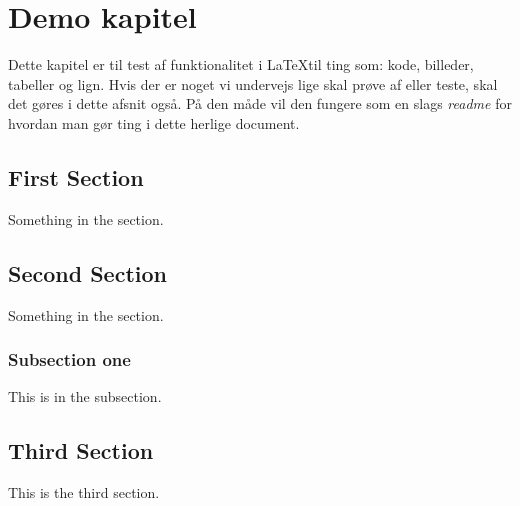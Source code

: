 \chapter{Demo kapitel}

Dette kapitel er til test af funktionalitet i \LaTeX til ting som: kode, billeder, tabeller og lign. Hvis der er noget vi undervejs lige skal prøve af eller teste, skal det gøres i dette afsnit også. På den måde vil den fungere som en slags \textit{readme} for hvordan man gør ting i dette herlige  document.

\newpage

\section{First Section}
Something in the section.

\section{Second Section}
Something in the section.

\subsection{Subsection one}
This is in the subsection.

\section{Third Section}
This is the third section.